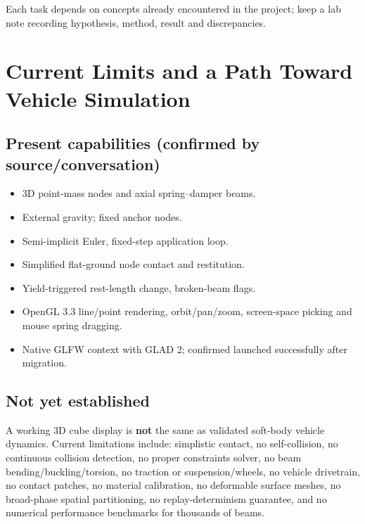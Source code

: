 \documentclass[
  10pt,
  a4paper,
]{article}
\providecommand{\tightlist}{%
  \setlength{\itemsep}{0pt}\setlength{\parskip}{0pt}}
\begin{document}
Each task depends on concepts already encountered in the project; keep a
lab note recording hypothesis, method, result and discrepancies.

\newpage

\section{Current Limits and a Path Toward Vehicle
Simulation}\label{current-limits-and-a-path-toward-vehicle-simulation}

\subsection{Present capabilities (confirmed by
source/conversation)}\label{present-capabilities-confirmed-by-sourceconversation}

\begin{itemize}
\tightlist
\item
  3D point-mass nodes and axial spring--damper beams.
\item
  External gravity; fixed anchor nodes.
\item
  Semi-implicit Euler, fixed-step application loop.
\item
  Simplified flat-ground node contact and restitution.
\item
  Yield-triggered rest-length change, broken-beam flags.
\item
  OpenGL 3.3 line/point rendering, orbit/pan/zoom, screen-space picking
  and mouse spring dragging.
\item
  Native GLFW context with GLAD 2; confirmed launched successfully after
  migration.
\end{itemize}

\subsection{Not yet established}\label{not-yet-established}

A working 3D cube display is \textbf{not} the same as validated
soft-body vehicle dynamics. Current limitations include: simplistic
contact, no self-collision, no continuous collision detection, no proper
constraints solver, no beam bending/buckling/torsion, no traction or
suspension/wheels, no vehicle drivetrain, no contact patches, no
material calibration, no deformable surface meshes, no broad-phase
spatial partitioning, no replay-determinism guarantee, and no numerical
performance benchmarks for thousands of beams.
\end{document}
